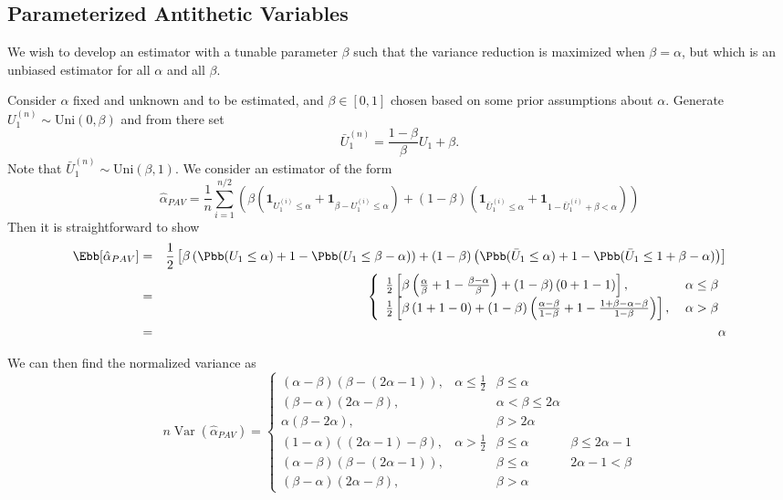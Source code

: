 \documentclass[11pt]{article}
\DeclareMathOperator{\var}{Var}
\begin{document}
\subsection{Parameterized Antithetic Variables}
We wish to develop an estimator with a tunable parameter $\beta$ such that the variance reduction is maximized when $\beta=\alpha$, but which is an unbiased estimator for all $\alpha$ and all $\beta$.

Consider $\alpha$ fixed and unknown and to be estimated, and $\beta \in [0,1]$ chosen based on some prior assumptions about $\alpha$. Generate $U_{1}^{(n)} \sim \mathrm{Uni}(0,\beta)$ and from there set
\begin{equation}
\bar{U}_{1}^{(n)} = \frac{1-\beta}{\beta} U_1 + \beta.
\end{equation}
Note that $\bar{U}_{1}^{(n)} \sim \mathrm{Uni}(\beta,1)$. We consider an estimator of the form
\begin{equation}
\hat{\alpha}_{PAV} = \frac{1}{n} \sum_{i=1}^{n/2} \left( \beta \left( \mathbf{1}_{U_{1}^{(i)} \leq \alpha} + \mathbf{1}_{\beta-U_{1}^{(i)} \leq \alpha} \right) + (1-\beta) \left( \mathbf{1}_{\bar{U}_{1}^{(i)} \leq \alpha} + \mathbf{1}_{1-\bar{U}_{1}^{(i)} + \beta < \alpha} \right) \right)
\end{equation}
Then it is straightforward to show
\begin{eqnarray}
\Ebb[\hat{\alpha}_{PAV}] &=& \frac{1}{2} \left[ \beta \left( \Pbb(U_1 \leq \alpha) + 1 - \Pbb(U_1 \leq \beta - \alpha) \right) + (1-\beta) \left( \Pbb(\bar{U}_1 \leq \alpha) + 1 - \Pbb( \bar{U}_1 \leq 1+ \beta - \alpha) \right) \right] \nonumber \\
&=& \left\{ \begin{array}{ll}
\frac{1}{2} \left[ \beta \left( \frac{\alpha}{\beta} + 1 - \frac{\beta-\alpha}{\beta} \right) + (1-\beta) \left(0 + 1 - 1 \right) \right] , \; & \alpha \leq \beta \\
\frac{1}{2} \left[ \beta \left(1 + 1 - 0 \right) + (1-\beta) \left( \frac{\alpha-\beta}{1-\beta} + 1 - \frac{1+\beta-\alpha-\beta}{1-\beta} \right) \right], \; & \alpha > \beta 
\end{array} \right. \nonumber \\
&=& \alpha
\end{eqnarray}

We can then find the normalized variance as
\begin{equation}n\var(\hat{\alpha}_{PAV}) = \left\{
\begin{array}{llll}
(\alpha-\beta)(\beta-(2\alpha-1)), & \alpha \leq \frac{1}{2} & \beta \leq \alpha & \\
(\beta-\alpha)(2\alpha-\beta), & & \alpha < \beta \leq 2 \alpha &  \\
\alpha(\beta-2\alpha), & & \beta > 2 \alpha & \\
(1-\alpha)((2\alpha-1)-\beta), & \alpha > \frac{1}{2} & \beta \leq \alpha & \beta \leq 2 \alpha - 1 \\
(\alpha-\beta)(\beta - (2\alpha-1)), & & \beta \leq \alpha & 2 \alpha - 1 < \beta \\
(\beta-\alpha)(2\alpha-\beta), & & \beta > \alpha 
\end{array}\right.
\end{equation}
\end{document}
